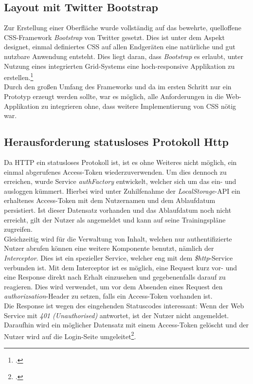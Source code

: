 \subsection{Layout mit Twitter Bootstrap}
\label{ssec:SPA-twitter-bootstrap}
Zur Erstellung einer Oberfläche wurde vollständig auf das bewehrte, quelloffene \ac{CSS}-Framework \textit{Bootstrap} von Twitter gesetzt. Dies ist unter dem Aspekt designet, einmal definiertes CSS auf allen Endgeräten eine natürliche und gut nutzbare Anwendung entsteht. Dies liegt daran, dass \textit{Bootstrap} es erlaubt, unter Nutzung eines integrierten Grid-Systems eine hoch-\gls{responsiv}e Applikation zu erstellen.\footcite{online:get-bootstrap}\\
Durch den großen Umfang des Frameworks und da im ersten Schritt nur ein Prototyp erzeugt werden sollte, war es möglich, alle Anforderungen in die Web-Applikation zu integrieren ohne, dass weitere Implementierung von CSS nötig war.

\subsection{Herausforderung statusloses Protokoll Http}
\label{ssec:statusloses-http}
Da HTTP ein statusloses Protokoll ist, ist es ohne Weiteres nicht möglich, ein einmal abgerufenes Access-Token wiederzuverwenden. Um dies dennoch zu erreichen, wurde Service \textit{authFactory} entwickelt, welcher sich um das ein- und ausloggen kümmert. Hierbei wird unter Zuhilfenahme der \textit{LocalStorage}-API ein erhaltenes Access-Token mit dem Nutzernamen und dem Ablaufdatum persistiert. Ist dieser Datensatz vorhanden und das Ablaufdatum noch nicht erreicht, gilt der Nutzer als angemeldet und kann auf seine Trainingspläne zugreifen. \\
Gleichzeitig wird für die Verwaltung von Inhalt, welchen nur authentifizierte Nutzer abrufen können eine weitere Komponente benutzt, nämlich der \textit{Interceptor}. Dies ist ein spezieller Service, welcher eng mit dem \textit{\$http}-Service verbunden ist. Mit dem Interceptor ist es möglich, eine Request kurz vor- und eine Response direkt nach Erhalt einzusehen und gegebenenfalls darauf zu reagieren. Dies wird verwendet, um vor dem Absenden eines Request den \textit{authorizsation}-Header zu setzen, falls ein Access-Token vorhanden ist. \\ Die Response ist wegen des eingehenden Statuscodes interessant: Wenn der Web Service mit \textit{401 (Unauthorised)} antwortet, ist der Nutzer nicht angemeldet. Daraufhin wird ein möglicher Datensatz mit einem Access-Token gelöscht und der Nutzer wird auf die Login-Seite umgeleitet\footcite{online:Created_SPA}. 

